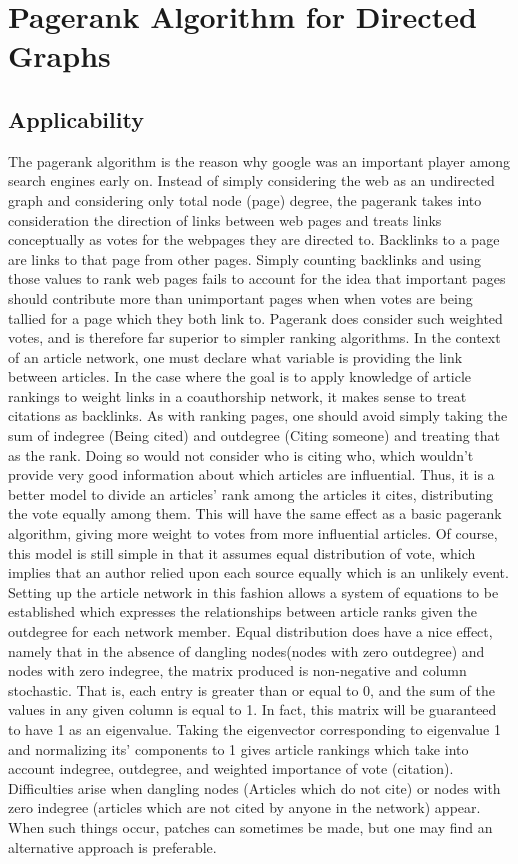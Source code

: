 \documentclass[14pt]{article} %
\begin{document}
\section{Pagerank Algorithm for Directed Graphs}
  \subsection{Applicability}
    The pagerank algorithm is the reason why google was an important player among search engines early on. Instead of simply considering the web as an undirected graph and considering only total node (page) degree, the pagerank takes into consideration the direction of links between web pages and treats links conceptually as votes for the webpages they are directed to. Backlinks to a page are links to that page from other pages. Simply counting backlinks and using those values to rank web pages fails to account for the idea that important pages should contribute more than unimportant pages when when votes are being tallied for a page which they both link to. Pagerank does consider such weighted votes, and is therefore far superior to simpler ranking algorithms. 
      In the context of an article network, one must declare what variable is providing the link between articles. In the case where the goal is to apply knowledge of article rankings to weight links in a coauthorship network, it makes sense to treat citations as backlinks. As with ranking pages, one should avoid simply taking the sum of indegree (Being cited) and outdegree (Citing someone) and treating that as the rank. Doing so would not consider who is citing who, which wouldn't provide very good information about which articles are influential. Thus, it is a better model to  divide an articles' rank among the articles it cites, distributing the vote equally among them. This will have the same effect as a basic pagerank algorithm, giving more weight to votes from more influential articles. Of course, this model is still simple in that it assumes equal distribution of vote, which implies that an author relied upon each source equally which is an unlikely event. Setting up the article network in this fashion allows a system of equations to be established which expresses the relationships between article ranks given the outdegree for each network member. Equal distribution does have a nice effect, namely that in the absence of dangling nodes(nodes with zero outdegree) and nodes with zero indegree, the matrix produced is non-negative and column stochastic. That is, each entry is greater than or equal to 0, and the sum of the values in any given column is equal to 1. In fact, this matrix will be guaranteed to have 1 as an eigenvalue. Taking the eigenvector corresponding to eigenvalue 1 and normalizing its' components to 1 gives article rankings which take into account indegree, outdegree, and weighted importance of vote (citation). Difficulties arise when dangling nodes (Articles which do not cite) or nodes with zero indegree (articles which are not cited by anyone in the network) appear. When such things occur, patches can sometimes be made, but one may find an alternative approach is preferable.
      
\end{document}
